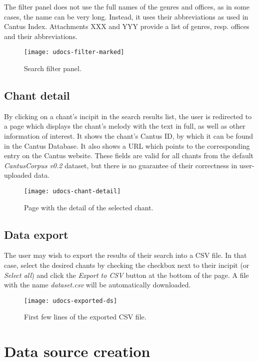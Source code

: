 The filter panel does not use the full names of the genres and offices, as in some cases, the name can be very long. Instead, it uses their abbreviations as used 
in Cantus Index. Attachments XXX and YYY provide a list of genres, resp. offices and their abbreviations.

\begin{figure}[!h]
\centering
\texttt{[image: udocs-filter-marked]}
\caption{Search filter panel.}
\label{fig:search_filter}
\end{figure}

\subsection{Chant detail}

By clicking on a chant's incipit in the search results list, the user is redirected to a page which displays the chant's melody with the text in full,
as well as other information of interest. It shows the chant's Cantus ID, by which it can be found in the Cantus Database. It also shows a URL which
points to the corresponding entry on the Cantus website. These fields are valid for all chants from the default \emph{CantusCorpus v0.2} dataset,
but there is no guarantee of their correctness in user-uploaded data.

\begin{figure}[!h]
\centering
\texttt{[image: udocs-chant-detail]}
\caption{Page with the detail of the selected chant.}
\label{fig:chant-detail}
\end{figure}

\subsection{Data export}
\label{section:data_export}

The user may wish to export the results of their search into a CSV file. In that case, select the desired chants by checking the checkbox next to
their incipit (or \emph{Select all}) and click the \emph{Export to CSV} button at the bottom of the page. A file with the name \emph{dataset.csv}
will be automatically downloaded.

\begin{figure}[!h]
\centering
\texttt{[image: udocs-exported-ds]}
\caption{First few lines of the exported CSV file.}
\label{fig:export-ex}
\end{figure}

\section{Data source creation}

